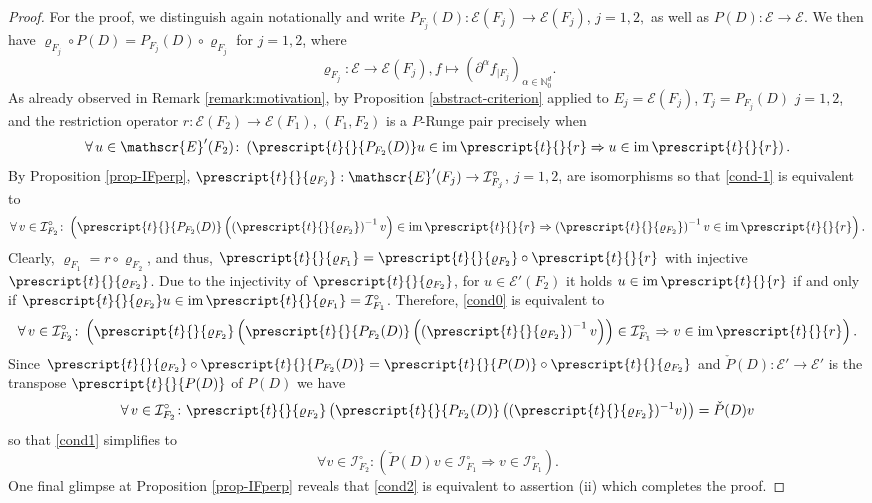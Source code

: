 \documentclass[10pt,leqno]{amsart}
\theoremstyle{definition}
\newcommand{\N}{\mathbb N}
\newcommand{\cI}{\mathcal I}
\newcommand{\im}{\operatorname{im}}
\let\rho\varrho
\begin{document}
\begin{proof}
	For the proof, we distinguish again notationally and write $P_{F_j}(D):\mathscr{E}(F_j)\to\mathscr{E}(F_j)$, $j=1,2,$
	as well as $P(D):\mathscr{E} \rightarrow\mathscr{E}$.
	We then have $\rho_{F_j}\circ P(D)=P_{F_j}(D)\circ\rho_{F_j}$ for $j=1,2$, where
	$$\rho_{F_j}:\mathscr{E} \rightarrow\mathscr{E}(F_j),f\mapsto (\partial^\alpha f_{\mid F_j})_{\alpha\in\N_0^d}.$$
	As already observed in Remark \ref{remark:motivation}, by Proposition \ref{abstract-criterion} applied to $E_j=\mathscr{E}(F_j)$, $T_j=P_{F_j}(D)$
	$j=1,2$, and the restriction operator $r\colon\mathscr{E}(F_2)\to\mathscr{E}(F_1)$, $(F_1,F_2)$ is a $P$-Runge pair precisely when
	\begin{equation}\label{cond-1}
		\forall\,u\in\mathscr{E}'(F_2)\colon\left(\prescript{t}{}{P_{F_2}(D)}u\in\im\prescript{t}{}{r}\Rightarrow u\in\im\prescript{t}{}{r}\right).
	\end{equation}
	By Proposition \ref{prop-IFperp}, $\prescript{t}{}{\rho_{F_j}}:\mathscr{E}'(F_j)\to\cI_{F_j}^\circ$, $j=1,2$, are isomorphisms so that \eqref{cond-1} is equivalent to
	\begin{equation}\label{cond0}
		\forall\,v\in\cI_{F_2}^\circ\colon\left(\prescript{t}{}{P_{F_2}(D)}\left(\left(\prescript{t}{}{\rho_{F_2}}\right)^{-1}v\right)\in\im\prescript{t}{}{r}\Rightarrow \left(\prescript{t}{}{\rho_{F_2}}\right)^{-1}v\in\im\prescript{t}{}{r}\right).
	\end{equation}
	Clearly, $\rho_{F_1}=r\circ\rho_{F_2}$, and thus, $\prescript{t}{}{\rho_{F_1}}=\prescript{t}{}{\rho_{F_2}}\circ\prescript{t}{}{r}$ with injective $\prescript{t}{}{\rho_{F_2}}$. Due to the injectivity of $\prescript{t}{}{\rho_{F_2}}$, for $u\in \mathscr{E}'(F_2)$ it holds $u\in\im\prescript{t}{}{r}$ if and only if $\prescript{t}{}{\rho_{F_2}}u\in \im \prescript{t}{}{\rho_{F_1}}=\cI_{F_1}^\circ$. Therefore, \eqref{cond0} is equivalent to 
	\begin{equation}\label{cond1}
		\forall\,v\in\cI_{F_2}^\circ\colon\left(\prescript{t}{}{\rho_{F_2}}\left(\prescript{t}{}{P_{F_2}(D)}\left(\left(\prescript{t}{}{\rho_{F_2}}\right)^{-1}v\right)\right)\in\cI_{F_1}^\circ \Rightarrow v\in\im\prescript{t}{}{r}\right).
	\end{equation}
	Since $\prescript{t}{}{\rho_{F_2}}\circ\prescript{t}{}{P_{F_2}(D)}=\prescript{t}{}{P(D)}\circ \prescript{t}{}{\rho_{F_2}}$ and $\check{P}(D):\mathscr{E}'\rightarrow\mathscr{E}'$ is the transpose $\prescript{t}{}{P(D)}$ of $P(D)$ we have
	$$\forall\,v\in\cI_{F_2}^\circ\colon\prescript{t}{}{\rho_{F_2}}\left(\prescript{t}{}{P_{F_2}(D)}\left((\prescript{t}{}{\rho_{F_2}})^{-1}v\right)\right) =\check{P}(D)v$$
	so that \eqref{cond1} simplifies to
	\begin{equation}\label{cond2}
		\forall v\in \cI_{F_2}^\circ\colon\left(\check{P}(D)v\in\cI_{F_1}^\circ\Rightarrow v\in\cI_{F_1}^\circ\right).
	\end{equation}
	One final glimpse at Proposition \ref{prop-IFperp} reveals that \eqref{cond2} is equivalent to assertion (ii) which completes the proof.
\end{proof}
\end{document}
